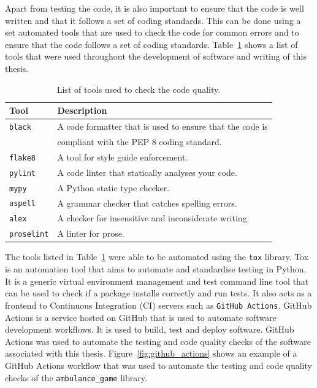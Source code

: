 Apart from testing the code, it is also important to ensure that the code is
well written and that it follows a set of coding standards.
This can be done using a set automated tools that are used to check the code
for common errors and to ensure that the code follows a set of coding standards.
Table~\ref{tab:code_quality_tools} shows a list of tools that were used
throughout the development of software and writing of this thesis.

\begin{table}[H]
    \centering
    \begin{tabular}{|l|l|}
        \hline
        \textbf{Tool} & \textbf{Description} \\
        \hline
        \texttt{black} & A code formatter that is used to ensure that the code
        is \\ & compliant with the PEP 8 coding standard. \\
        \hline
        \texttt{flake8} & A tool for style guide enforcement. \\
        \hline
        \texttt{pylint} & A code linter that statically analyses your code. \\
        \hline
        \texttt{mypy} & A Python static type checker. \\
        \hline
        \hline
        \texttt{aspell} & A grammar checker that catches spelling errors. \\
        \hline
        \texttt{alex} & A checker for insensitive and inconsiderate writing. \\
        \hline
        \texttt{proselint} & A linter for prose. \\
        \hline
    \end{tabular}
    \caption{List of tools used to check the code quality.}
    \label{tab:code_quality_tools}
\end{table}

The tools listed in Table~\ref{tab:code_quality_tools} were able to be
automated using the \texttt{tox} library.
Tox is an automation tool that aims to automate and standardise testing in
Python.
It is a generic virtual environment management and test command line tool that
can be used to check if a package installs correctly and run tests.
It also acts as a frontend to Continuous Integration (CI) servers such as
\texttt{GitHub Actions}.
GitHub Actions is a service hosted on GitHub that is used to automate software
development workflows.
It is used to build, test and deploy software.
GitHub Actions was used to automate the testing and code quality checks of the
software associated with this thesis.
Figure~\ref{fig:github_actions} shows an example of a GitHub Actions workflow
that was used to automate the testing and code quality checks of the
\texttt{ambulance\_game} library.

